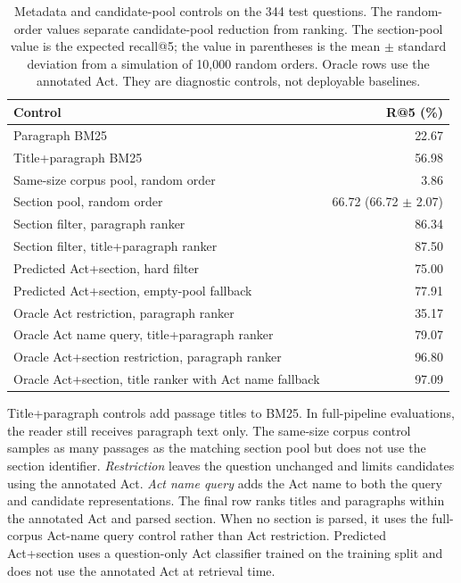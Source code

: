 \documentclass[pdflatex,sn-basic]{sn-jnl}%
\theoremstyle{thmstyleone}%
\theoremstyle{thmstyletwo}%
\theoremstyle{thmstylethree}%
\begin{document}
\begin{table}[!htbp]
    \caption{Metadata and candidate-pool controls on the 344 test questions.
    The random-order values separate candidate-pool reduction from ranking.
    The section-pool value is the expected recall@5; the value in parentheses
    is the mean $\pm$ standard deviation from a simulation of 10,000 random
    orders. Oracle rows use the annotated Act. They are diagnostic controls,
    not deployable baselines.}
    \label{tab:metadata_controls}
    \centering
    \scriptsize
    \setlength{\tabcolsep}{5pt}
    \begin{tabular}{@{}lr@{}}
        \toprule
        Control & R@5 (\%) \\
        \midrule
        Paragraph BM25 & 22.67 \\
        Title+paragraph BM25 & 56.98 \\
        Same-size corpus pool, random order & 3.86 \\
        Section pool, random order & 66.72 (66.72 $\pm$ 2.07) \\
        Section filter, paragraph ranker & 86.34 \\
        Section filter, title+paragraph ranker & 87.50 \\
        Predicted Act+section, hard filter & 75.00 \\
        Predicted Act+section, empty-pool fallback & 77.91 \\
        Oracle Act restriction, paragraph ranker & 35.17 \\
        Oracle Act name query, title+paragraph ranker & 79.07 \\
        Oracle Act+section restriction, paragraph ranker & 96.80 \\
        Oracle Act+section, title ranker with Act name fallback & 97.09 \\
        \bottomrule
    \end{tabular}
    \begin{flushleft}
        {\scriptsize Title+paragraph controls add passage titles to BM25.
        In full-pipeline evaluations, the reader still receives paragraph
        text only. The same-size corpus control samples as many passages as
        the matching section pool but does not use the section identifier.
        \emph{Restriction} leaves the question unchanged and limits candidates
        using the annotated Act. \emph{Act name query} adds the Act name to
        both the query and candidate representations. The final row ranks
        titles and paragraphs within the annotated Act and parsed section.
        When no section is parsed, it uses the full-corpus Act-name query
        control rather than Act restriction. Predicted Act+section uses a
        question-only Act classifier trained on the training split and does
        not use the annotated Act at retrieval time.}
    \end{flushleft}
\end{table}
\end{document}
